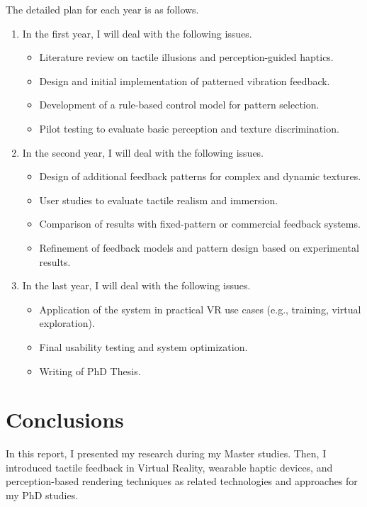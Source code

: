 \documentclass[graybox]{svmult}
\begin{document}
The detailed plan for each year is as follows.
\begin{enumerate}
	\item In the first year, I will deal with the following issues.
	      \begin{itemize}
		      \item Literature review on tactile illusions and perception-guided haptics.
		      \item Design and initial implementation of patterned vibration feedback.
		      \item Development of a rule-based control model for pattern selection.
		      \item Pilot testing to evaluate basic perception and texture discrimination.
	      \end{itemize}
	\item In the second year, I will deal with the following issues.
	      \begin{itemize}
		      \item Design of additional feedback patterns for complex and dynamic textures.
		      \item User studies to evaluate tactile realism and immersion.
		      \item Comparison of results with fixed-pattern or commercial feedback systems.
		      \item Refinement of feedback models and pattern design based on experimental results.
	      \end{itemize}
	\item In the last year, I will deal with the following issues.
	      \begin{itemize}
		      \item Application of the system in practical VR use cases (e.g., training, virtual exploration).
		      \item Final usability testing and system optimization.
		      \item Writing of PhD Thesis.
	      \end{itemize}
\end{enumerate}


\section{Conclusions}
In this report, I presented my research during my Master studies. Then, I introduced tactile feedback in Virtual Reality, wearable haptic devices, and perception-based rendering techniques as related technologies and approaches for my PhD studies. 


\end{document}

